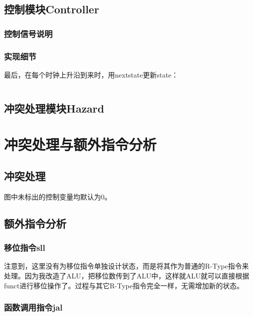 \documentclass[12pt]{article} %
\begin{document}
\begin{sloppypar}
\subsection{控制模块Controller}

\subsubsection{控制信号说明}

\subsubsection{实现细节}


最后，在每个时钟上升沿到来时，用nextstate更新state：
\begin{lstlisting}[language=Verilog]  
\end{lstlisting}  

\subsection{冲突处理模块Hazard}



\newpage
\section{冲突处理与额外指令分析}

\subsection{冲突处理}

图中未标出的控制变量均默认为0。

\subsection{额外指令分析}


\subsubsection{移位指令sll}

注意到，这里没有为移位指令单独设计状态，而是将其作为普通的R-Type指令来处理。因为我改造了ALU，把移位数传到了ALU中，这样就ALU就可以直接根据funct进行移位操作了。过程与其它R-Type指令完全一样，无需增加新的状态。

\subsubsection{函数调用指令jal}


\end{sloppypar}
\end{document}
